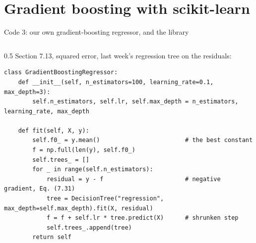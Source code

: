 \documentclass[10pt,aspectratio=169]{beamer}
\begin{document}
\section{Gradient boosting with scikit-learn}

\begin{frame}[fragile]{Code 3: our own gradient-boosting regressor, and the library}
\begin{columns}[T]
\begin{column}{0.5\textwidth}
\footnotesize
Section 7.13, squared error, last week's regression tree on the residuals:
\begin{lstlisting}[basicstyle=\ttfamily\tiny]
class GradientBoostingRegressor:
    def __init__(self, n_estimators=100, learning_rate=0.1, max_depth=3):
        self.n_estimators, self.lr, self.max_depth = n_estimators, learning_rate, max_depth

    def fit(self, X, y):
        self.f0_ = y.mean()                        # the best constant
        f = np.full(len(y), self.f0_)
        self.trees_ = []
        for _ in range(self.n_estimators):
            residual = y - f                       # negative gradient, Eq. (7.31)
            tree = DecisionTree("regression", max_depth=self.max_depth).fit(X, residual)
            f = f + self.lr * tree.predict(X)      # shrunken step
            self.trees_.append(tree)
        return self


\end{lstlisting}
\end{column}
\end{columns}
\end{frame}
\end{document}
